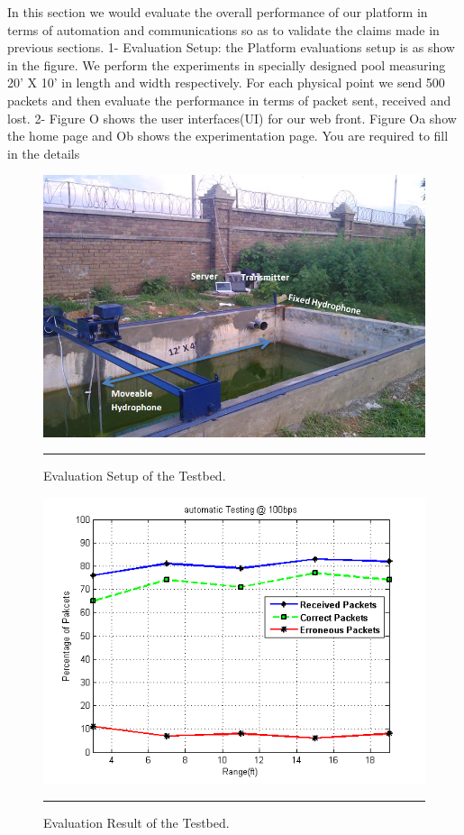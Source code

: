 In this section we would evaluate the overall performance of our platform in terms of automation and communications so as to validate the claims made in previous sections.
1-	Evaluation Setup: the Platform evaluations setup is as show in the figure. We perform the experiments in specially designed pool measuring 20’ X 10’ in length and width respectively. For each physical point we send 500 packets and then evaluate the performance in terms of packet sent, received and lost. 
2-	Figure O shows the user interfaces(UI) for our web front. Figure Oa show the home page and Ob shows the experimentation page. You are required to fill in the details 

\begin{figure}[htbp]
	\centering
		\includegraphics[width=5in]{Figures/setup11.png}
		\rule{35em}{0.5pt}
	\caption[Evaluation Setup of the Testbed]{Evaluation Setup of the Testbed.}
	\label{fig:evaluation}
\end{figure}


\begin{figure}[htbp]
	\centering
		\includegraphics[width=5in]{Figures/results.png}
		\rule{35em}{0.5pt}
	\caption[Evaluation Result of the Testbed]{Evaluation Result of the Testbed.}
	\label{fig:evaluation_results}
\end{figure}


